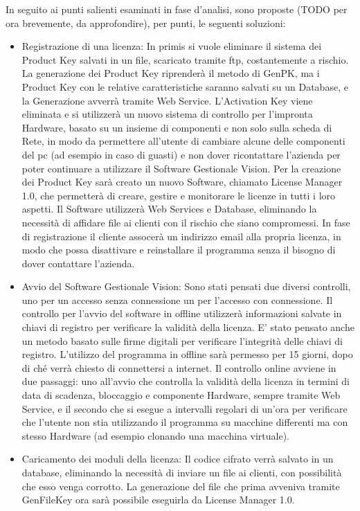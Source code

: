 In seguito ai punti salienti esaminati in fase d’analisi, sono proposte (TODO per ora brevemente, da approfondire), per punti, le seguenti soluzioni:
\begin{itemize}

\item	Registrazione di una licenza: In primis si vuole eliminare il sistema dei Product Key salvati in un file, scaricato tramite ftp, costantemente a rischio. La generazione dei Product Key riprenderà il metodo di GenPK, ma i Product Key con le relative caratteristiche saranno salvati su un Database, e la Generazione avverrà tramite Web Service. L’Activation Key viene eliminata e si utilizzerà un nuovo sistema di controllo per l’impronta Hardware, basato su un insieme di componenti e non solo sulla scheda di Rete, in modo da permettere all’utente di cambiare alcune delle componenti del pc (ad esempio in caso di guasti) e non dover ricontattare l’azienda per poter continuare a utilizzare il Software Gestionale Vision. Per la creazione dei Product Key sarà creato un nuovo Software, chiamato License Manager 1.0, che permetterà di creare, gestire e monitorare le licenze in tutti i loro aspetti. Il Software utilizzerà Web Services e Database, eliminando la necessità di affidare file ai clienti con il rischio che siano compromessi. In fase di registrazione il cliente assocerà un indirizzo email alla propria licenza, in modo che possa disattivare e reinstallare il programma senza il bisogno di dover contattare l’azienda.
\item	Avvio del Software Gestionale Vision:  Sono stati pensati due diversi controlli, uno per un accesso senza connessione un per l’accesso con connessione. Il controllo per l’avvio del software in offline utilizzerà informazioni salvate in chiavi di registro per verificare la validità della licenza. E’ stato pensato anche un metodo basato sulle firme digitali per verificare l’integrità delle chiavi di registro. L’utilizzo del programma in offline sarà permesso per 15 giorni, dopo di ché verrà chiesto di connettersi a internet. Il controllo online avviene in due passaggi: uno all’avvio che controlla la validità della licenza in termini di data di scadenza, bloccaggio e componente Hardware, sempre tramite Web Service, e il secondo che si esegue a intervalli regolari di un’ora per verificare che l’utente non stia utilizzando il programma su macchine differenti ma con stesso Hardware (ad esempio clonando una macchina virtuale).
\item	Caricamento dei moduli della licenza: Il codice cifrato verrà salvato in un database, eliminando la necessità di inviare un file ai clienti, con possibilità che esso venga corrotto. La generazione del file che prima avveniva tramite GenFileKey ora sarà possibile eseguirla da License Manager 1.0.

\end{itemize}
